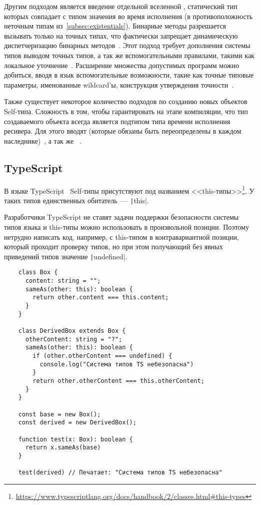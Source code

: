 Другим подходом является введение отдельной вселенной , статический тип которых совпадает с типом значения во время исполнения (в противоположность неточным типам из~\ref{subsec:existentials}).
Бинарные методы разрешается вызывать только на точных типах, что фактически запрещает динамическую диспетчеризацию бинарных методов~\cite{bruce1997increasing}.
Этот подход требует дополнения системы типов выводом точных типов, а так же вспомогательными правилами, такими как локальное уточнение~\cite{saito2009matching}.
Расширение множества допустимых программ можно добиться, вводя в язык вспомогательные возможности, такие как точные типовые параметры, именованные wildcard'ы, конструкция утверждения точности~\cite{ryu2016thistype}.

Также существует некоторое количество подходов по созданию новых объектов Self-типа.
Сложность в том, чтобы гарантировать на этапе компиляции, что тип создаваемого объекта всегда является подтипом типа времени исполнения ресивера.
Для этого вводят  (которые обязаны быть переопределены в каждом наследнике)~\cite{saito2009matching}, а так же ~\cite{ryu2016thistype}.


\subsection{TypeScript}

В языке TypeScript~\cite{bierman2014understanding} Self-типы присутствуют под названием <<this-типы>>\footnote{\url{https://www.typescriptlang.org/docs/handbook/2/classes.html\#this-types}}.
У таких типов единственных обитатель~--- \texttt|this|.

Разработчики TypeScript не ставят задачи поддержки безопасности системы типов языка и this-типы можно использовать в произвольной позиции.
Поэтому нетрудно написать код, например, с this-типом в контравариантной позиции, который проходит проверку типов, но при этом получающий без явных приведений типов значение \texttt|undefined|.

\begin{verbatim}
    class Box {
      content: string = "";
      sameAs(other: this): boolean {
        return other.content === this.content;
      }
    }

    class DerivedBox extends Box {
      otherContent: string = "?";
      sameAs(other: this): boolean {
        if (other.otherContent === undefined) {
          console.log("Система типов TS небезопасна")
        }
        return other.otherContent === this.otherContent;
      }
    }

    const base = new Box();
    const derived = new DerivedBox();

    function test(x: Box): boolean {
      return x.sameAs(base)
    }

    test(derived) // Печатает: "Система типов TS небезопасна"
\end{verbatim}


